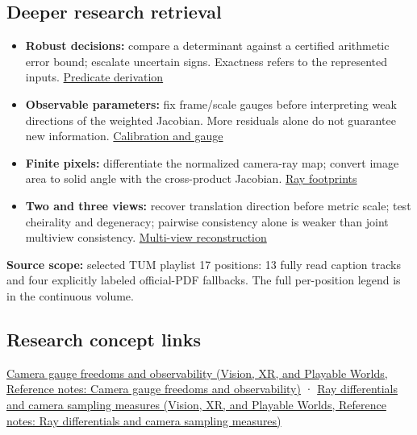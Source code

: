 \subsection{Deeper research retrieval}\label{appendix-a2b71a18f5a2-deeper-research-retrieval}

\begin{itemize}
\tightlist
\item
  \textbf{Robust decisions:} compare a determinant against a certified arithmetic error bound; escalate uncertain signs. Exactness refers to the represented inputs. \hyperref[02-foundations-ii-ch034-a-sign-can-matter-more-than-a-coordinate-robust-predicates]{Predicate derivation}
\item
  \textbf{Observable parameters:} fix frame/scale gauges before interpreting weak directions of the weighted Jacobian. More residuals alone do not guarantee new information. \hyperref[02-foundations-ii-ch036-calibration-needs-informative-observations-and-a-fixed-gauge]{Calibration and gauge}
\item
  \textbf{Finite pixels:} differentiate the normalized camera-ray map; convert image area to solid angle with the cross-product Jacobian. \hyperref[02-foundations-ii-ch036-a-camera-ray-carries-a-pixel-footprint]{Ray footprints}
\item
  \textbf{Two and three views:} recover translation direction before metric scale; test cheirality and degeneracy; pairwise consistency alone is weaker than joint multiview consistency. \hyperref[02-foundations-ii-ch036-calibrated-two-view-geometry-direction-before-distance]{Multi-view reconstruction}
\end{itemize}

\textbf{Source scope:} selected TUM playlist 17 positions: 13 fully read caption tracks and four explicitly labeled official-PDF fallbacks. The full per-position legend is in {the continuous volume}.

\subsection{Research concept links}\label{appendix-a2b71a18f5a2-research-concept-links}

\href{../07-Vision-XR-and-Playable-Worlds/main.pdf\#nameddest=appendix-113f0267e5f4}{Camera gauge freedoms and observability (Vision, XR, and Playable Worlds, Reference notes: Camera gauge freedoms and observability)} · \href{../07-Vision-XR-and-Playable-Worlds/main.pdf\#nameddest=appendix-8c40fad29462}{Ray differentials and camera sampling measures (Vision, XR, and Playable Worlds, Reference notes: Ray differentials and camera sampling measures)}
